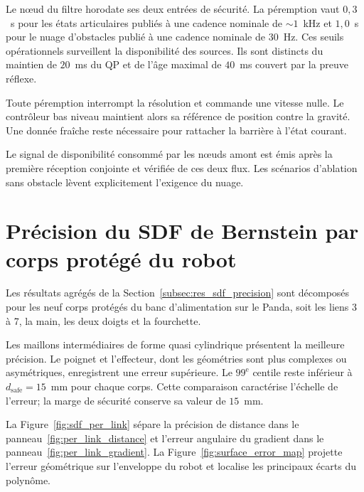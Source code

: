 Le n\oe ud du filtre horodate ses deux entrées de sécurité. La péremption vaut $0{,}3$~s pour les états articulaires publiés à une cadence nominale de ${\sim}1$~kHz et $1{,}0$~s pour le nuage d'obstacles publié à une cadence nominale de $30$~Hz. Ces seuils opérationnels surveillent la disponibilité des sources. Ils sont distincts du maintien de $20$~ms du QP et de l'âge maximal de $40$~ms couvert par la preuve réflexe.

Toute péremption interrompt la résolution et commande une vitesse nulle. Le contrôleur bas niveau maintient alors sa référence de position contre la gravité. Une donnée fraîche reste nécessaire pour rattacher la barrière à l'état courant.

Le signal de disponibilité consommé par les n\oe uds amont est émis après la première réception conjointe et vérifiée de ces deux flux. Les scénarios d'ablation sans obstacle lèvent explicitement l'exigence du nuage.

\label{annexe:resultats_complementaires}

\section*{Précision du \acs{SDF} de Bernstein par corps protégé du robot}

Les résultats agrégés de la Section~\ref{subsec:res_sdf_precision} sont décomposés pour les neuf corps protégés du banc d'alimentation sur le Panda, soit les liens 3 à 7, la main, les deux doigts et la fourchette.

Les maillons intermédiaires de forme quasi cylindrique présentent la meilleure précision. Le poignet et l'effecteur, dont les géométries sont plus complexes ou asymétriques, enregistrent une erreur supérieure. Le $99^{\text{e}}$ centile reste inférieur à $d_{\mathrm{safe}}=15$~mm pour chaque corps. Cette comparaison caractérise l'échelle de l'erreur; la marge de sécurité conserve sa valeur de $15$~mm.

La Figure~\ref{fig:sdf_per_link} sépare la précision de distance dans le panneau~\ref{fig:per_link_distance} et l'erreur angulaire du gradient dans le panneau~\ref{fig:per_link_gradient}. La Figure~\ref{fig:surface_error_map} projette l'erreur géométrique sur l'enveloppe du robot et localise les principaux écarts du polynôme.

